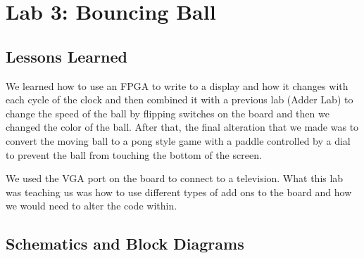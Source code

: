 \chapter{Lab 3: Bouncing Ball \\
\label{Introduction}}

\section{Lessons Learned \label{Section::Lessons Learned}}
    We learned how to use an FPGA to write to a display and how it changes with each cycle of the clock and then combined it with a previous lab (Adder Lab) to change the speed of the ball by flipping switches on the board and then we changed the color of the ball. After that, the final alteration that we made was to convert the moving ball to a pong style game with a paddle controlled by a dial to prevent the ball from touching the bottom of the screen. 

    We used the VGA port on the board to connect to a television. What this lab was teaching us was how to use different types of add ons to the board and how we would need to alter the code within. 
 \section{Schematics and Block Diagrams}
    
